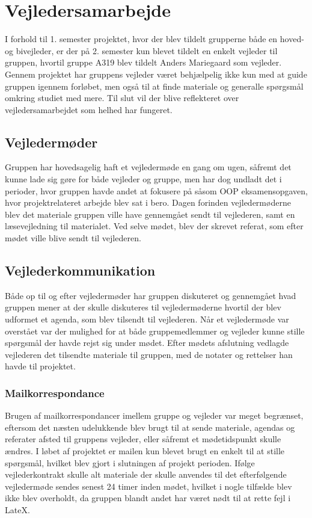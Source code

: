 \chapter{Vejledersamarbejde}\label{Vejldersamarbejde}
I forhold til 1. semester projektet, hvor der blev tildelt grupperne både en hoved- og bivejleder, er der på 2. semester kun blevet tildelt en enkelt vejleder til gruppen, hvortil gruppe A319 blev tildelt Anders Mariegaard som vejleder. Gennem projektet har gruppens vejleder været behjælpelig ikke kun med at guide gruppen igennem forløbet, men også til at finde materiale og generalle spørgsmål omkring studiet med mere. Til slut vil der blive reflekteret over vejledersamarbejdet som helhed har fungeret.

\section{Vejledermøder}\label{Vejledermoeder}
Gruppen har hovedsagelig haft et vejledermøde en gang om ugen, såfremt det kunne lade sig gøre for både vejleder og gruppe, men har dog undladt det i perioder, hvor gruppen havde andet at fokusere på såsom OOP eksamensopgaven, hvor projektrelateret arbejde blev sat i bero. Dagen forinden vejledermøderne blev det materiale gruppen ville have gennemgået sendt til vejlederen, samt en læsevejledning til materialet. Ved selve mødet, blev der skrevet referat, som efter mødet ville blive sendt til vejlederen.

\section{Vejlederkommunikation}\label{Vejlederkommunikation}
Både op til og efter vejledermøder har gruppen diskuteret og gennemgået hvad gruppen mener at der skulle diskuteres til vejledermøderne hvortil der blev udformet et agenda, som blev tilsendt til vejlederen. Når et vejledermøde var overstået var der mulighed for at både gruppemedlemmer og vejleder kunne stille spørgsmål der havde rejst sig under mødet. Efter mødets afslutning vedlagde vejlederen det tilsendte materiale til gruppen, med de notater og rettelser han havde til projektet. 

\subsection*{Mailkorrespondance}\label{Mailkorrespondance}
Brugen af mailkorrespondancer imellem gruppe og vejleder var meget begrænset, eftersom det næsten udelukkende blev brugt til at sende materiale, agendas og referater afsted til gruppens vejleder, eller såfremt et mødetidspunkt skulle ændres. I løbet af projektet er mailen kun blevet brugt en enkelt til at stille spørgsmål, hvilket blev gjort i slutningen af projekt perioden. Ifølge vejlederkontrakt skulle alt materiale der skulle anvendes til det efterfølgende vejledermøde sendes senest 24 timer inden mødet, hvilket i nogle tilfælde blev ikke blev overholdt, da gruppen blandt andet har været nødt til at rette fejl i LateX.


